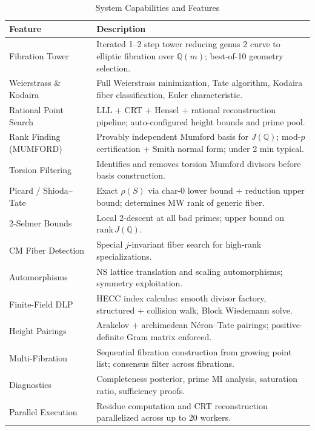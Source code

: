 \documentclass[11pt, a4paper]{article}
\begin{document}
\begin{table}[h]
    \centering
    \renewcommand{\arraystretch}{1.2}
    \begin{tabularx}{\textwidth}{l X}
        \toprule
        \textbf{Feature} & \textbf{Description} \\
        \midrule
        Fibration Tower & Iterated 1--2 step tower reducing genus 2 curve to elliptic fibration over $\mathbb{Q}(m)$; best-of-10 geometry selection. \\
        Weierstrass \& Kodaira & Full Weierstrass minimization, Tate algorithm, Kodaira fiber classification, Euler characteristic. \\
        Rational Point Search & LLL + CRT + Hensel + rational reconstruction pipeline; auto-configured height bounds and prime pool. \\
        Rank Finding (MUMFORD) & Provably independent Mumford basis for $J(\mathbb{Q})$; mod-$p$ certification + Smith normal form; under 2 min typical. \\
        Torsion Filtering & Identifies and removes torsion Mumford divisors before basis construction. \\
        Picard / Shioda--Tate & Exact $\rho(S)$ via char-0 lower bound + reduction upper bound; determines MW rank of generic fiber. \\
        2-Selmer Bounds & Local 2-descent at all bad primes; upper bound on $\text{rank}\, J(\mathbb{Q})$. \\
        CM Fiber Detection & Special $j$-invariant fiber search for high-rank specializations. \\
        Automorphisms & NS lattice translation and scaling automorphisms; symmetry exploitation. \\
        Finite-Field DLP & HECC index calculus: smooth divisor factory, structured + collision walk, Block Wiedemann solve. \\
        Height Pairings & Arakelov + archimedean N\'eron--Tate pairings; positive-definite Gram matrix enforced. \\
        Multi-Fibration & Sequential fibration construction from growing point list; consensus filter across fibrations. \\
        Diagnostics & Completeness posterior, prime MI analysis, saturation ratio, sufficiency proofs. \\
        Parallel Execution & Residue computation and CRT reconstruction parallelized across up to 20 workers. \\
        \bottomrule
    \end{tabularx}
    \caption{System Capabilities and Features}
\end{table}
\end{document}
